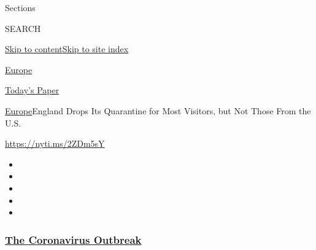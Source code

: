 Sections

SEARCH

\protect\hyperlink{site-content}{Skip to
content}\protect\hyperlink{site-index}{Skip to site index}

\href{https://www.nytimes3xbfgragh.onion/section/world/europe}{Europe}

\href{https://myaccount.nytimes3xbfgragh.onion/auth/login?response_type=cookie\&client_id=vi}{}

\href{https://www.nytimes3xbfgragh.onion/section/todayspaper}{Today's
Paper}

\href{/section/world/europe}{Europe}\textbar{}England Drops Its
Quarantine for Most Visitors, but Not Those From the U.S.

\url{https://nyti.ms/2ZDm5sY}

\begin{itemize}
\item
\item
\item
\item
\item
\end{itemize}

\hypertarget{the-coronavirus-outbreak}{%
\subsubsection{\texorpdfstring{\href{https://www.nytimes3xbfgragh.onion/news-event/coronavirus?name=styln-coronavirus-national\&region=TOP_BANNER\&variant=undefined\&block=storyline_menu_recirc\&action=click\&pgtype=Article\&impression_id=98d1fe80-e396-11ea-8ad8-e9df2f9ec099}{The
Coronavirus
Outbreak}}{The Coronavirus Outbreak}}\label{the-coronavirus-outbreak}}

